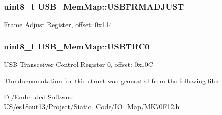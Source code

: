 \subsubsection[{U\+S\+B\+F\+R\+M\+A\+D\+J\+U\+S\+T}]{\setlength{\rightskip}{0pt plus 5cm}uint8\+\_\+t U\+S\+B\+\_\+\+Mem\+Map\+::\+U\+S\+B\+F\+R\+M\+A\+D\+J\+U\+S\+T}\label{struct_u_s_b___mem_map_a1bb1b3975dfcbbe78635e2d08b16553d}
Frame Adjust Register, offset\+: 0x114 \hypertarget{struct_u_s_b___mem_map_a10d494a848ee49ff264d62eb0bfb439e}{}
\subsubsection[{U\+S\+B\+T\+R\+C0}]{\setlength{\rightskip}{0pt plus 5cm}uint8\+\_\+t U\+S\+B\+\_\+\+Mem\+Map\+::\+U\+S\+B\+T\+R\+C0}\label{struct_u_s_b___mem_map_a10d494a848ee49ff264d62eb0bfb439e}
U\+S\+B Transceiver Control Register 0, offset\+: 0x10\+C 

The documentation for this struct was generated from the following file\+:\begin{DoxyCompactItemize}
\item 
D\+:/\+Embedded Software U\+S/es18aut13/\+Project/\+Static\+\_\+\+Code/\+I\+O\+\_\+\+Map/\hyperlink{_m_k70_f12_8h}{M\+K70\+F12.\+h}\end{DoxyCompactItemize}
